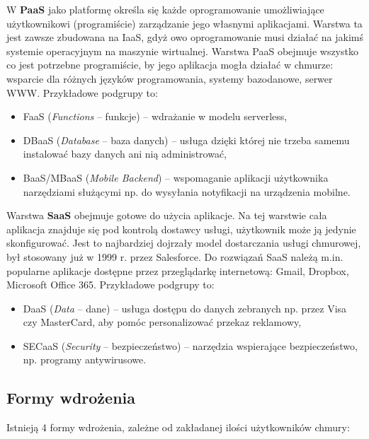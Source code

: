 \documentclass[12pt,a4paper,twoside,titlepage,openright]{book}
\begin{document}
W \textbf{PaaS} jako platformę określa się każde oprogramowanie umożliwiające użytkownikowi (programiście) zarządzanie jego własnymi aplikacjami. Warstwa ta jest zawsze zbudowana na IaaS, gdyż owo oprogramowanie musi działać na jakimś systemie operacyjnym na maszynie wirtualnej. Warstwa PaaS obejmuje wszystko co jest potrzebne programiście, by jego aplikacja mogła działać w chmurze: wsparcie dla różnych języków programowania, systemy bazodanowe, serwer WWW. Przykładowe podgrupy to:
\begin{itemize}
\item FaaS (\textit{Functions} -- funkcje) -- wdrażanie w modelu serverless,
\item DBaaS (\textit{Database} -- baza danych) -- usługa dzięki której nie trzeba samemu instalować bazy danych ani nią administrować,
\item BaaS/MBaaS (\textit{Mobile Backend}) -- wspomaganie aplikacji użytkownika narzędziami służącymi np. do wysyłania notyfikacji na urządzenia mobilne.
\end{itemize}

Warstwa \textbf{SaaS} obejmuje gotowe do użycia aplikacje. Na tej warstwie cała aplikacja znajduje się pod kontrolą dostawcy usługi, użytkownik może ją jedynie skonfigurować. Jest to najbardziej dojrzały model dostarczania usługi chmurowej, był stosowany już w 1999 r. przez Salesforce. Do rozwiązań SaaS należą m.in. popularne aplikacje dostępne przez przeglądarkę internetową: Gmail, Dropbox, Microsoft Office 365. Przykładowe podgrupy to:
\begin{itemize}
\item DaaS (\textit{Data} -- dane) -- usługa dostępu do danych zebranych np. przez Visa czy MasterCard, aby pomóc personalizować przekaz reklamowy,
\item SECaaS (\textit{Security} -- bezpieczeństwo) -- narzędzia wspierające bezpieczeństwo, np. programy antywirusowe.
\end{itemize}

\subsection{Formy wdrożenia}

Istnieją 4 formy wdrożenia, zależne od zakładanej ilości użytkowników chmury:
\end{document}
